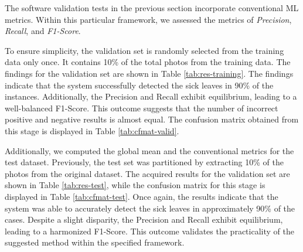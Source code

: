 The software validation tests in the previous section incorporate conventional ML metrics. Within this particular framework, we assessed the metrics of \textit{Precision}, \textit{Recall}, and \textit{F1-Score}. 

To ensure simplicity, the validation set is randomly selected from the training data only once. It contains 10\% of the total photos from the training data. The findings for the validation set are shown in Table \ref{tab:res-training}. The findings indicate that the system successfully detected the sick leaves in 90\% of the instances. Additionally, the Precision and Recall exhibit equilibrium, leading to a well-balanced F1-Score. This outcome suggests that the number of incorrect positive and negative results is almost equal. The confusion matrix obtained from this stage is displayed in Table \ref{tab:cfmat-valid}.

\begin{table}[h!]
\centering
\caption{Metric results for the validation dataset. This set was obtained separating 10\% of the training data for validation.}
\label{tab:res-training}
\end{table}

\begin{table}[h!]
\centering
\caption{Confusion Matrix for the validation data}
\label{tab:cfmat-valid}
\end{table}

Additionally, we computed the global mean and the conventional metrics for the test dataset. Previously, the test set was partitioned by extracting 10\% of the photos from the original dataset. The acquired results for the validation set are shown in Table \ref{tab:res-test}, while the confusion matrix for this stage is displayed in Table \ref{tab:cfmat-test}. Once again, the results indicate that the system was able to accurately detect the sick leaves in approximately 90\% of the cases. Despite a slight disparity, the Precision and Recall exhibit equilibrium, leading to a harmonized F1-Score. This outcome validates the practicality of the suggested method within the specified framework.


